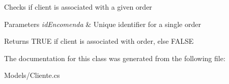 Checks if client is associated with a given order 


\begin{DoxyParams}{Parameters}
{\em id\+Encomenda} & Unique identifier for a single order\\
\hline
\end{DoxyParams}
\begin{DoxyReturn}{Returns}
T\+R\+UE if client is associated with order, else F\+A\+L\+SE
\end{DoxyReturn}


The documentation for this class was generated from the following file\+:\begin{DoxyCompactItemize}
\item 
Models/Cliente.\+cs\end{DoxyCompactItemize}
